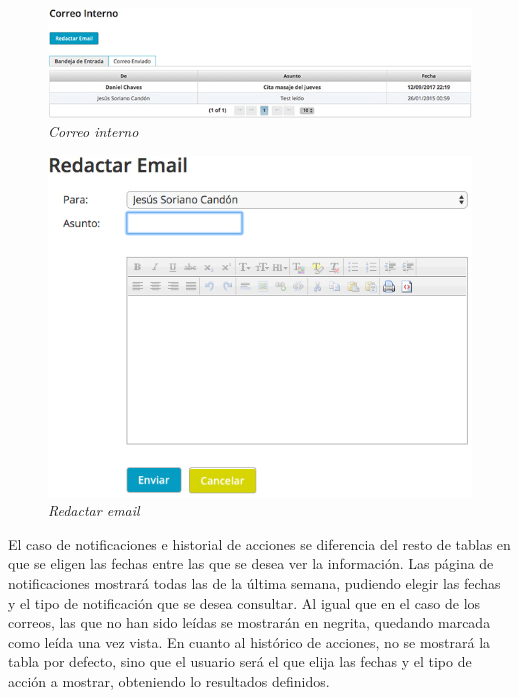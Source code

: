 \begin{figure}
\centering
  \includegraphics[scale=.70]{img/manual/correo-interno.jpg}
  \caption{\textit{Correo interno}}
  \label{fig:correo-interno}
\end{figure}

\begin{figure}
\centering
  \includegraphics[scale=.50]{img/manual/redactar-email.jpg}
  \caption{\textit{Redactar email}}
  \label{fig:redactar-email}
\end{figure}

El caso de notificaciones e historial de acciones se diferencia del resto de tablas en que se eligen las fechas entre las que se desea ver la información. Las página de notificaciones mostrará todas las de la última semana, pudiendo elegir las fechas y el tipo de notificación que se desea consultar. Al igual que en el caso de los correos, las que no han sido leídas se mostrarán en negrita, quedando marcada como leída una vez vista. En cuanto al histórico de acciones, no se mostrará la tabla por defecto, sino que el usuario será el que elija las fechas y el tipo de acción a mostrar, obteniendo lo resultados definidos. \\

